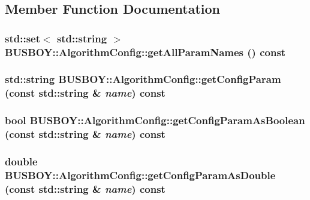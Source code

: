 \subsection{Member Function Documentation}
\hypertarget{classBUSBOY_1_1AlgorithmConfig_aa8052d110b7617fe89058a7426452b74}{
\subsubsection[{getAllParamNames}]{\setlength{\rightskip}{0pt plus 5cm}std::set$<$ std::string $>$ BUSBOY::AlgorithmConfig::getAllParamNames () const}}
\label{classBUSBOY_1_1AlgorithmConfig_aa8052d110b7617fe89058a7426452b74}
\hypertarget{classBUSBOY_1_1AlgorithmConfig_add1e628d4d2700f3be58a3cf7b4176f6}{
\subsubsection[{getConfigParam}]{\setlength{\rightskip}{0pt plus 5cm}std::string BUSBOY::AlgorithmConfig::getConfigParam (const std::string \& {\em name}) const}}
\label{classBUSBOY_1_1AlgorithmConfig_add1e628d4d2700f3be58a3cf7b4176f6}
\hypertarget{classBUSBOY_1_1AlgorithmConfig_add5d0b2340d81e70ed249de0c5478d23}{
\subsubsection[{getConfigParamAsBoolean}]{\setlength{\rightskip}{0pt plus 5cm}bool BUSBOY::AlgorithmConfig::getConfigParamAsBoolean (const std::string \& {\em name}) const}}
\label{classBUSBOY_1_1AlgorithmConfig_add5d0b2340d81e70ed249de0c5478d23}
\hypertarget{classBUSBOY_1_1AlgorithmConfig_a1be9c77dd8275d1bb7b16a2f2551ff1d}{
\subsubsection[{getConfigParamAsDouble}]{\setlength{\rightskip}{0pt plus 5cm}double BUSBOY::AlgorithmConfig::getConfigParamAsDouble (const std::string \& {\em name}) const}}

